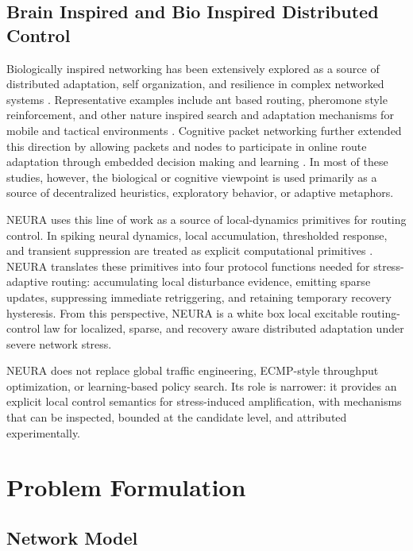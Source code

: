\documentclass[5p,times]{elsarticle}
\begin{document}
\subsection{Brain Inspired and Bio Inspired Distributed Control}

Biologically inspired networking has been extensively explored as a source of distributed adaptation, self organization, and resilience in complex networked systems \cite{dressler2010survey,meisel2010taxonomy}. Representative examples include ant based routing, pheromone style reinforcement, and other nature inspired search and adaptation mechanisms for mobile and tactical environments \cite{dicaro1998antnet,dicaro2005anthocnet,ducatelle2006anthocnetanalysis}. Cognitive packet networking further extended this direction by allowing packets and nodes to participate in online route adaptation through embedded decision making and learning \cite{gelenbe2000cognitivepackets,gelenbe2001design,gelenbe2001measurement,ray2022cpn}. In most of these studies, however, the biological or cognitive viewpoint is used primarily as a source of decentralized heuristics, exploratory behavior, or adaptive metaphors.

NEURA uses this line of work as a source of local-dynamics primitives for routing control. In spiking neural dynamics, local accumulation, thresholded response, and transient suppression are treated as explicit computational primitives \cite{maass1997thirdgen,gerstner2002spiking,auge2021encoding,han2021snnsurvey}. NEURA translates these primitives into four protocol functions needed for stress-adaptive routing: accumulating local disturbance evidence, emitting sparse updates, suppressing immediate retriggering, and retaining temporary recovery hysteresis. From this perspective, NEURA is a white box local excitable routing-control law for localized, sparse, and recovery aware distributed adaptation under severe network stress.

NEURA does not replace global traffic engineering, ECMP-style throughput optimization, or learning-based policy search. Its role is narrower: it provides an explicit local control semantics for stress-induced amplification, with mechanisms that can be inspected, bounded at the candidate level, and attributed experimentally.

\section{Problem Formulation}

\subsection{Network Model}
\end{document}
